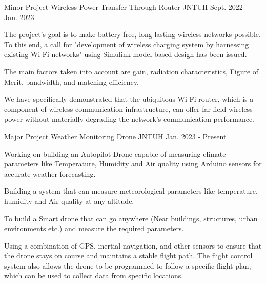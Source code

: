 \documentclass[11pt, a4paper]{russell}
\begin{document}
\begin{cventries}
\cventry
  {\small Minor Project} %
  {\normalsize Wireless Power Transfer Through Router} %
  {\small JNTUH} %
  {\small Sept. 2022 - Jan. 2023 } %
    {
      \begin{cvitems} %
      \item \smallCreating The project's goal is to make battery-free, long-lasting wireless networks possible. To this end, a call for "development of wireless charging system by harnessing existing Wi-Fi networks" using Simulink model-based design has been issued.
      \item \small The main factors taken into account are gain, radiation characteristics, Figure of Merit, bandwidth, and matching efficiency.
      \item \small We have specifically demonstrated that the ubiquitous Wi-Fi router, which is a component of wireless communication infrastructure, can offer far field wireless power without materially degrading the network's communication performance.
      \end{cvitems}
    }
\vspace{3mm}
\cventry
  {\small Major Project} %
  {\normalsize Weather Monitoring Drone} %
  {\small JNTUH} %
  {\small Jan. 2023 - Present } %
    {
      \begin{cvitems} %
      \item\smallCreating Working on building  an Autopilot Drone capable of measuring climate parameters like Temperature, Humidity and Air quality using Arduino sensors for accurate weather
      forecasting.
      \item \small Building a system that can measure meteorological parameters like temperature,
      humidity and Air quality at any altitude.
      \item \small To build a Smart drone that can go anywhere (Near buildings, structures, urban environments etc.) and measure the required parameters.
      \item \small Using a combination of GPS, inertial navigation, and other sensors to ensure that the drone stays on course and maintains a stable flight path. The flight control system also allows the drone to be programmed to follow a specific flight plan, which can be used to collect data from specific locations.
      \end{cvitems}
    }
\end{cventries}
\end{document}
